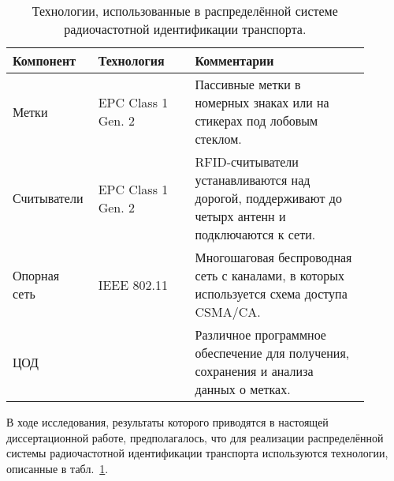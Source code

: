 \begin{table}[ht!]
    \renewcommand{\arraystretch}{1.3}
    \caption{Технологии, использованные в распределённой системе радиочастотной идентификации транспорта.}
    \label{table:ch1_technologies}
	\begin{tabular}{ |p{0.17\linewidth}|p{0.26\linewidth}|p{0.47\linewidth}| }\hline
		Компонент & Технология & Комментарии\\\hline\hline
		Метки & EPC Class 1 Gen. 2 & Пассивные метки в номерных знаках или на стикерах под лобовым стеклом.\\\hline
		Считыватели & EPC Class 1 Gen. 2 & RFID-считыватели устанавливаются над дорогой, поддерживают до четырх антенн и подключаются к сети.\\\hline
		Опорная сеть & IEEE 802.11 & Многошаговая беспроводная сеть с каналами, в которых используется схема доступа CSMA/CA.\\\hline
		ЦОД &  & Различное программное обеспечение для получения, сохранения и анализа данных о метках.\\\hline
	\end{tabular}

\end{table}

В ходе исследования, результаты которого приводятся в настоящей диссертационной работе, предполагалось, что для реализации распределённой системы радиочастотной идентификации транспорта используются технологии, описанные в табл.~\ref{table:ch1_technologies}.







